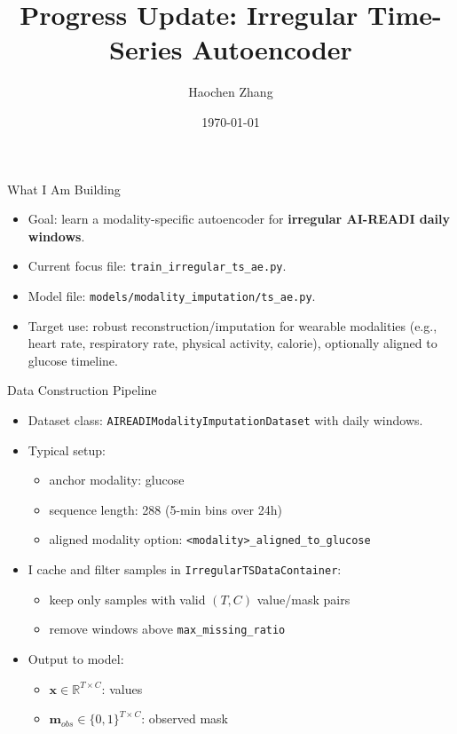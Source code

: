 \documentclass[aspectratio=169]{beamer}
\title{Progress Update: Irregular Time-Series Autoencoder}
\author{Haochen Zhang}
\date{\today}
\begin{document}
\begin{frame}
  \titlepage
\end{frame}

\begin{frame}{What I Am Building}
  \begin{itemize}
    \item Goal: learn a modality-specific autoencoder for \textbf{irregular AI-READI daily windows}.
    \item Current focus file: \texttt{train\_irregular\_ts\_ae.py}.
    \item Model file: \texttt{models/modality\_imputation/ts\_ae.py}.
    \item Target use: robust reconstruction/imputation for wearable modalities (e.g., heart rate, respiratory rate, physical activity, calorie), optionally aligned to glucose timeline.
  \end{itemize}
\end{frame}

\begin{frame}{Data Construction Pipeline}
  \begin{itemize}
    \item Dataset class: \texttt{AIREADIModalityImputationDataset} with daily windows.
    \item Typical setup:
    \begin{itemize}
      \item anchor modality: glucose
      \item sequence length: 288 (5-min bins over 24h)
      \item aligned modality option: \texttt{<modality>\_aligned\_to\_glucose}
    \end{itemize}
    \item I cache and filter samples in \texttt{IrregularTSDataContainer}:
    \begin{itemize}
      \item keep only samples with valid \((T, C)\) value/mask pairs
      \item remove windows above \texttt{max\_missing\_ratio}
    \end{itemize}
    \item Output to model:
    \begin{itemize}
      \item \(\mathbf{x}\in\mathbb{R}^{T\times C}\): values
      \item \(\mathbf{m}_{obs}\in\{0,1\}^{T\times C}\): observed mask
    \end{itemize}
  \end{itemize}
\end{frame}
\end{document}
